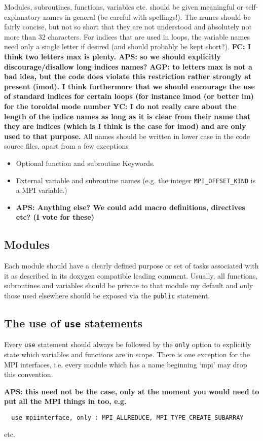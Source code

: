 \documentclass[12pt,twoside,notitlepage,a4paper]{article}
\newcommand{\code}[1]{\texttt{#1}}
\begin{document}
Modules, subroutines, functions, variables etc. should be given meaningful or self-explanatory
names in general (be careful with spellings!). The names should be fairly concise, but not so short
that they are not understood and absolutely not more than 32 characters. For indices that are used in loops, the variable names
need only a single letter if desired (and should probably be kept short?). {\bf FC: I think two letters max is plenty.
APS: so we should explicitly discourage/disallow long indices names?}
{\bf AGP: to letters max is not a bad idea, but the code does violate this restriction rather strongly 
at present (imod). I think furthermore that we should encourage the use of standard indices for certain 
loops (for instance imod (or better im) for the toroidal mode number}
\textbf{YC: I do not really care about the length of the indice names as long as it is clear from their name that they are indices (which is I think is the case for imod) and are only used to that purpose. }
All names should be written in lower case in the code source files, apart from a few exceptions

\begin{itemize}
\item Optional function and subroutine Keywords.
\item External variable and subroutine names (e.g. the integer \code{MPI_OFFSET_KIND} is a
MPI variable.)
\item
{\bf APS: Anything else? We could add macro definitions, directives etc? (I vote for these)}
\end{itemize}

\subsection{Modules}

Each module should have a clearly defined purpose or set of tasks associated
with it as described in its doxygen compatible leading comment. Usually, all functions, subroutines and variables should be
private to that module my default and only those used elsewhere should be
exposed via the \code{public} statement.

\subsection{The use of \code{use} statements}

Every \code{use} statement should always be followed by the \code{only} option to explicitly
state which variables and functions are in scope. There is one exception for the MPI
interfaces, i.e. every module which has a name beginning `mpi' may drop this convention.
{\bf APS: this need not be the case, only at the moment you would need to put all the MPI
things in too, e.g.
\begin{verbatim}
  use mpiinterface, only : MPI_ALLREDUCE, MPI_TYPE_CREATE_SUBARRAY
\end{verbatim}
etc.}
\end{document}
